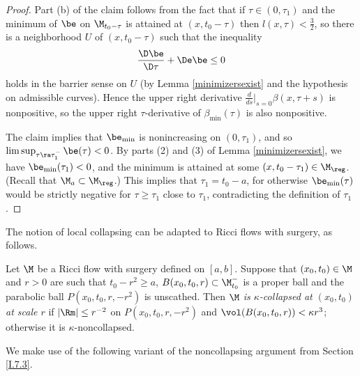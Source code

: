 \begin{proof}
Part (b) of the claim follows from the fact that if $\tau\in (0,\tau_1)$ and
the minimum of $\be$ on $\M_{t_0 - \tau}$ is attained at
$(x,t_0 - \tau)$ then $l(x,\tau)< \frac32$, so there is a neighborhood $U$
of $(x,{t_0 - \tau})$ such that the inequality
\begin{equation}
\frac{\D \be}{\D \tau}+\De \be \leq 0
\end{equation}
holds in the barrier sense on $U$ (by Lemma \ref{minimizersexist} and the hypothesis
on admissible curves).
Hence the upper right derivative $\frac{d}{ds} \Big|_{s=0} \beta(x, \tau+s)$ is
nonpositive, so the upper right $\tau$-derivative of
$\beta_{\min}(\tau)$ is also nonpositive.


The claim implies that $\be_{\min}$ is  nonincreasing on $(0,\tau_1)$,
and so
$\limsup_{\tau\ra \tau_1^-}\be(\tau)<0$.
By parts (2) and (3) of Lemma \ref{minimizersexist},
we have $\be_{\min}(\tau_1)<0$, and the minimum is attained at some
$(x,{t_0 - \tau_1})\in
\M_{\reg}$.
(Recall that $\M_a \subset \M_{\reg}$.)
This implies that $\tau_1=t_0-a$, for otherwise $\be_{\min}(\tau)$
would be strictly negative for $\tau\geq\tau_1 $ close to $\tau_1$,
contradicting the definition of $\tau_1$.
\end{proof}

The notion of local collapsing can be adapted to Ricci flows with surgery,
as follows.
\begin{definition}
  \label{def:kl-reduced-l-geometry-kappa-noncollapsing}

\label{surgerycollapsedef}
Let $\M$ be a Ricci flow with surgery defined on $[a,b]$. Suppose that
$(x_0,t_0)\in\M$ and $r>0$ are such that $t_0-r^2\geq a$,
$B(x_0,t_0,r)\subset\M_{t_0}^-$ is a proper ball
and the parabolic ball $P(x_0,t_0,r,-r^2)$ is unscathed.
Then {\em $\M$ is $\kappa$-collapsed at $(x_0,t_0)$ at scale
$r$} if $|\Rm|\leq r^{-2}$ on $P(x_0,t_0,r,-r^2)$ and
$\vol(B(x_0,t_0,r))<\kappa r^3$; otherwise it is $\kappa$-noncollapsed.
\end{definition}

We make use of the following variant of the noncollapsing
argument from Section \ref{I.7.3}.

